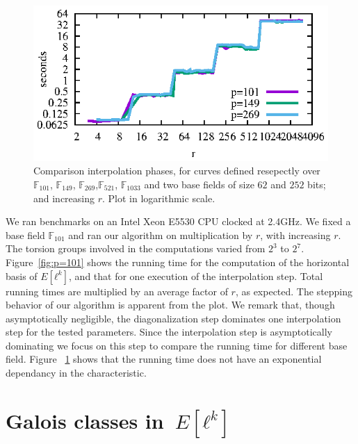 \documentclass{lms}
\newcommand{\F}{\mathbb{F}}
\begin{document}
\begin{figure}%
\centering
\includegraphics[scale=1]{benchmarks/graphe-101-149-269.eps}
\caption{Comparison interpolation phases, for
  curves defined resepectly over $\F_{101}$, $\F_{149}$, $\F_{269}$,$\F_{521}$, $\F_{1033}$ and two base fields of size $62$ and $252$ bits; and increasing $r$. Plot in logarithmic scale.}
\label{fig:p=101-149-269}
\end{figure}


We ran benchmarks on an Intel Xeon E5530 CPU clocked at 2.4GHz. We
fixed a base field $\F_{101}$ and ran our algorithm on multiplication by $r$, with increasing $r$. 
The torsion groups involved in the computations varied from $2^3$ to $2^7$.
Figure~\ref{fig:p=101} shows the running time for the computation of
the horizontal basis of $E[ℓ^k]$, and that for one execution of the
interpolation step. Total running times are multiplied by an average
factor of $r$, as expected. The stepping behavior of our algorithm is
apparent from the plot. We remark that, though asymptotically negligible, the diagonalization
step dominates one interpolation step for the tested parameters. Since 
the interpolation step is asymptotically dominating we focus on this step 
to compare the running time for different base field. Figure ~\ref{fig:p=101-149-269}
shows that the running time does not have an exponential dependancy in 
the characteristic.





\appendix

\section{Galois classes in~$E[ℓ^k]$}
\label{ap:galois}
\end{document}

